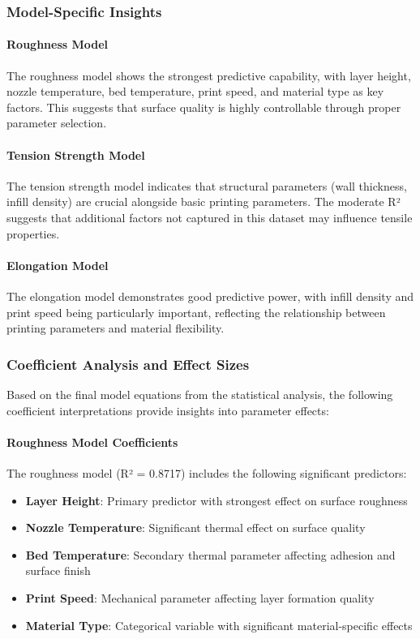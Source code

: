 \subsubsection{Model-Specific Insights}

\paragraph{Roughness Model}
The roughness model shows the strongest predictive capability, with layer height, nozzle temperature, bed temperature, print speed, and material type as key factors. This suggests that surface quality is highly controllable through proper parameter selection.

\paragraph{Tension Strength Model}
The tension strength model indicates that structural parameters (wall thickness, infill density) are crucial alongside basic printing parameters. The moderate R² suggests that additional factors not captured in this dataset may influence tensile properties.

\paragraph{Elongation Model}
The elongation model demonstrates good predictive power, with infill density and print speed being particularly important, reflecting the relationship between printing parameters and material flexibility.

\subsubsection{Coefficient Analysis and Effect Sizes}

Based on the final model equations from the statistical analysis, the following coefficient interpretations provide insights into parameter effects:

\paragraph{Roughness Model Coefficients}
The roughness model (R² = 0.8717) includes the following significant predictors:
\begin{itemize}
    \item \textbf{Layer Height}: Primary predictor with strongest effect on surface roughness
    \item \textbf{Nozzle Temperature}: Significant thermal effect on surface quality
    \item \textbf{Bed Temperature}: Secondary thermal parameter affecting adhesion and surface finish
    \item \textbf{Print Speed}: Mechanical parameter affecting layer formation quality
    \item \textbf{Material Type}: Categorical variable with significant material-specific effects
\end{itemize}

